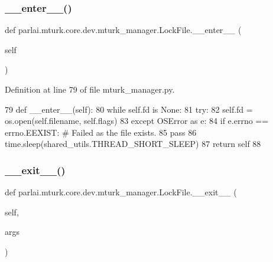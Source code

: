\subsubsection{\texorpdfstring{\+\_\+\+\_\+enter\+\_\+\+\_\+()}{\_\_enter\_\_()}}
{\footnotesize\ttfamily def parlai.\+mturk.\+core.\+dev.\+mturk\+\_\+manager.\+Lock\+File.\+\_\+\+\_\+enter\+\_\+\+\_\+ (\begin{DoxyParamCaption}\item[{}]{self }\end{DoxyParamCaption})}



Definition at line 79 of file mturk\+\_\+manager.\+py.


\begin{DoxyCode}
79     \textcolor{keyword}{def }\_\_enter\_\_(self):
80         \textcolor{keywordflow}{while} self.fd \textcolor{keywordflow}{is} \textcolor{keywordtype}{None}:
81             \textcolor{keywordflow}{try}:
82                 self.fd = os.open(self.filename, self.flags)
83             \textcolor{keywordflow}{except} OSError \textcolor{keyword}{as} e:
84                 \textcolor{keywordflow}{if} e.errno == errno.EEXIST:  \textcolor{comment}{# Failed as the file exists.}
85                     \textcolor{keywordflow}{pass}
86             time.sleep(shared\_utils.THREAD\_SHORT\_SLEEP)
87         \textcolor{keywordflow}{return} self
88 
\end{DoxyCode}
\mbox{\label{classparlai_1_1mturk_1_1core_1_1dev_1_1mturk__manager_1_1LockFile_a31fdb12564e073944e053df1a196a561}} 
\subsubsection{\texorpdfstring{\+\_\+\+\_\+exit\+\_\+\+\_\+()}{\_\_exit\_\_()}}
{\footnotesize\ttfamily def parlai.\+mturk.\+core.\+dev.\+mturk\+\_\+manager.\+Lock\+File.\+\_\+\+\_\+exit\+\_\+\+\_\+ (\begin{DoxyParamCaption}\item[{}]{self,  }\item[{}]{args }\end{DoxyParamCaption})}



